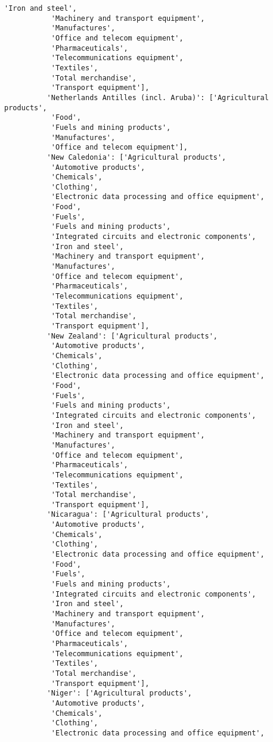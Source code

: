 \documentclass[11pt]{article}
\begin{document}
\begin{Verbatim}[commandchars=\\\{\}]
           'Iron and steel',
           'Machinery and transport equipment',
           'Manufactures',
           'Office and telecom equipment',
           'Pharmaceuticals',
           'Telecommunications equipment',
           'Textiles',
           'Total merchandise',
           'Transport equipment'],
          'Netherlands Antilles (incl. Aruba)': ['Agricultural products',
           'Food',
           'Fuels and mining products',
           'Manufactures',
           'Office and telecom equipment'],
          'New Caledonia': ['Agricultural products',
           'Automotive products',
           'Chemicals',
           'Clothing',
           'Electronic data processing and office equipment',
           'Food',
           'Fuels',
           'Fuels and mining products',
           'Integrated circuits and electronic components',
           'Iron and steel',
           'Machinery and transport equipment',
           'Manufactures',
           'Office and telecom equipment',
           'Pharmaceuticals',
           'Telecommunications equipment',
           'Textiles',
           'Total merchandise',
           'Transport equipment'],
          'New Zealand': ['Agricultural products',
           'Automotive products',
           'Chemicals',
           'Clothing',
           'Electronic data processing and office equipment',
           'Food',
           'Fuels',
           'Fuels and mining products',
           'Integrated circuits and electronic components',
           'Iron and steel',
           'Machinery and transport equipment',
           'Manufactures',
           'Office and telecom equipment',
           'Pharmaceuticals',
           'Telecommunications equipment',
           'Textiles',
           'Total merchandise',
           'Transport equipment'],
          'Nicaragua': ['Agricultural products',
           'Automotive products',
           'Chemicals',
           'Clothing',
           'Electronic data processing and office equipment',
           'Food',
           'Fuels',
           'Fuels and mining products',
           'Integrated circuits and electronic components',
           'Iron and steel',
           'Machinery and transport equipment',
           'Manufactures',
           'Office and telecom equipment',
           'Pharmaceuticals',
           'Telecommunications equipment',
           'Textiles',
           'Total merchandise',
           'Transport equipment'],
          'Niger': ['Agricultural products',
           'Automotive products',
           'Chemicals',
           'Clothing',
           'Electronic data processing and office equipment',

\end{Verbatim}
\end{document}
